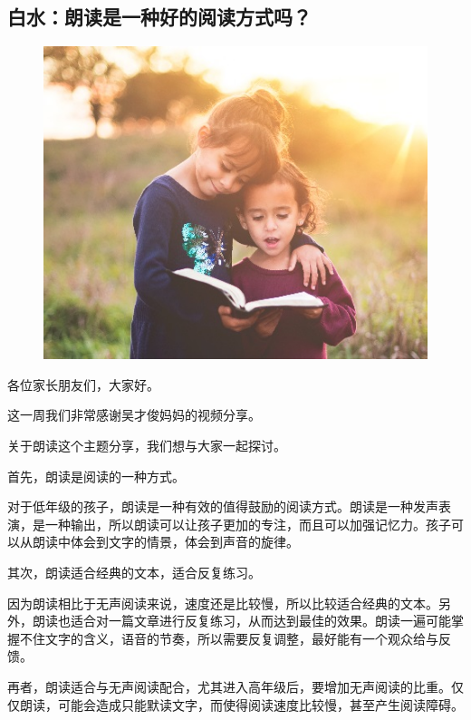 \vspace{10pt}

{\centering\subsection*{白水：朗读是一种好的阅读方式吗？}}


\renewcommand{\leftmark}{白水：朗读是一种好的阅读方式吗？}

\begin{figure}[htbp]

\centering

\includegraphics[width = .5\textwidth]{./ch/v1.jpg}

\end{figure}

各位家长朋友们，大家好。



这一周我们非常感谢吴才俊妈妈的视频分享。


关于朗读这个主题分享，我们想与大家一起探讨。



首先，朗读是阅读的一种方式。



对于低年级的孩子，朗读是一种有效的值得鼓励的阅读方式。朗读是一种发声表演，是一种输出，所以朗读可以让孩子更加的专注，而且可以加强记忆力。孩子可以从朗读中体会到文字的情景，体会到声音的旋律。



其次，朗读适合经典的文本，适合反复练习。



因为朗读相比于无声阅读来说，速度还是比较慢，所以比较适合经典的文本。另外，朗读也适合对一篇文章进行反复练习，从而达到最佳的效果。朗读一遍可能掌握不住文字的含义，语音的节奏，所以需要反复调整，最好能有一个观众给与反馈。



再者，朗读适合与无声阅读配合，尤其进入高年级后，要增加无声阅读的比重。仅仅朗读，可能会造成只能默读文字，而使得阅读速度比较慢，甚至产生阅读障碍。



